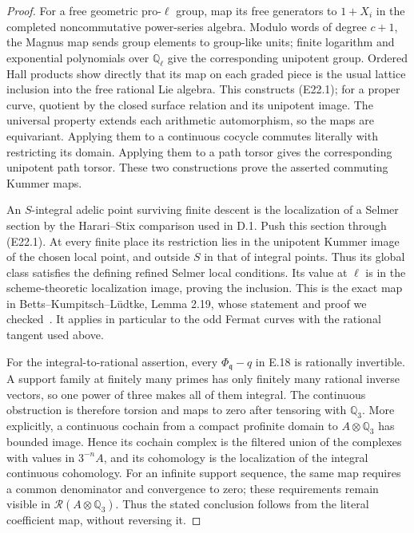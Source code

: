 \begin{proof}
For a free geometric pro-$\ell$ group, map
its free generators to $1+X_i$ in the
completed noncommutative power-series
algebra. Modulo words of degree $c+1$,
the Magnus map sends group elements to
group-like units; finite logarithm and
exponential polynomials over $\mathbb Q_\ell$
give the corresponding unipotent group.
Ordered Hall products show directly
that its map on each graded piece is
the usual lattice inclusion into the
free rational Lie algebra. This
constructs (E22.1); for a proper curve,
quotient by the closed surface relation
and its unipotent image. The universal
property extends each arithmetic
automorphism, so the maps are equivariant.
Applying them to a continuous cocycle
commutes literally with restricting
its domain. Applying them to a path
torsor gives the corresponding
unipotent path torsor. These two
constructions prove the asserted
commuting Kummer maps.

An $S$-integral adelic point surviving
finite descent is the localization of
a Selmer section by the Harari--Stix
comparison used in D.1. Push this
section through (E22.1). At every finite
place its restriction lies in the
unipotent Kummer image of the chosen
local point, and outside $S$ in that
of integral points. Thus its global
class satisfies the defining refined
Selmer local conditions. Its value
at $\ell$ is in the scheme-theoretic
localization image, proving the
inclusion. This is the exact map
in Betts--Kumpitsch--L\"udtke,
Lemma 2.19, whose statement and proof
we checked~\cite{BettsKumpitschLudtke2026}.
It applies in particular to the odd
Fermat curves with the rational
tangent used above.

For the integral-to-rational assertion,
every $\Phi_{\mathfrak q}-q$ in E.18
is rationally invertible. A support
family at finitely many primes has
only finitely many rational inverse
vectors, so one power of three makes
all of them integral. The continuous
obstruction is therefore torsion and
maps to zero after tensoring with
$\mathbb Q_3$. More explicitly, a
continuous cochain from a compact
profinite domain to $A\otimes\mathbb Q_3$
has bounded image. Hence its cochain
complex is the filtered union of
the complexes with values in $3^{-n}A$,
and its cohomology is the localization
of the integral continuous cohomology.
For an infinite support sequence,
the same map requires a common
denominator and convergence to zero;
these requirements remain visible
in $\mathcal R(A\otimes\mathbb Q_3)$.
Thus the stated conclusion follows
from the literal coefficient map,
without reversing it.


\end{proof}
